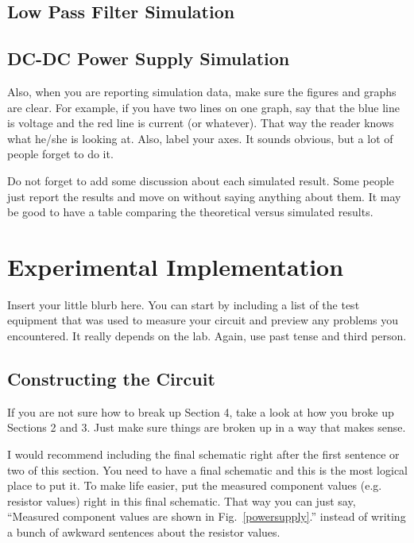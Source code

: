 \documentclass[11pt]{article}
\begin{document}
\subsection{Low Pass Filter Simulation}

\subsection{DC-DC Power Supply Simulation}

Also, when you are reporting simulation data, make sure the figures and graphs are clear. For example, if you have two lines on one graph, say that the blue line is voltage and the red line is current (or whatever). That way the reader knows what he/she is looking at. Also, label your axes. It sounds obvious, but a lot of people forget to do it.

Do not forget to add some discussion about each simulated result. Some people just report the results and move on without saying anything about them. It may be good to have a table comparing the theoretical versus simulated results. 

\section{Experimental Implementation}
\label{exp_section}

Insert your little blurb here. You can start by including a list of the test equipment that was used to measure your circuit and preview any problems you encountered. It really depends on the lab. Again, use past tense and third person.

\subsection{Constructing the Circuit}

If you are not sure how to break up Section 4, take a look at how you broke up Sections 2 and 3. Just make sure things are broken up in a way that makes sense. 

I would recommend including the final schematic right after the first sentence or two of this section. You need to have a final schematic and this is the most logical place to put it. To make life easier, put the measured component values (e.g. resistor values) right in this final schematic. That way you can just say, “Measured component values are shown in Fig.~\ref{powersupply}.'' instead of writing a bunch of awkward sentences about the resistor values.
\end{document}
